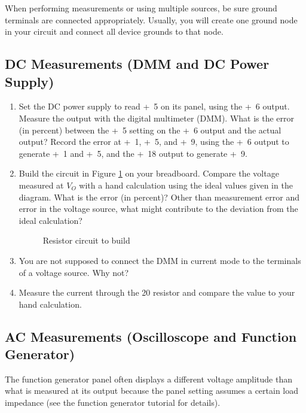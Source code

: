 \documentclass{article}
\begin{document}
When performing measurements or using multiple sources, be sure ground terminals are connected appropriately. Usually, you will create one ground node in your circuit and connect all device grounds to that node.

\subsection{DC Measurements (DMM and DC Power Supply)}

\begin{enumerate}

\item Set the DC power supply to read \unit{+5}{\volt} on its panel, using the \unit{+6}{\volt} output. Measure the output with the digital multimeter (DMM). What is the error (in percent) between the \unit{+5}{\volt} setting on the \unit{+6}{\volt} output and the actual output? Record the error at \unit{+1}{\volt}, \unit{+5}{\volt}, and \unit{+9}{\volt}, using the \unit{+6}{\volt} output to generate \unit{+1}{\volt} and \unit{+5}{\volt}, and the \unit{+18}{\volt} output to generate \unit{+9}{\volt}.

\item Build the circuit in Figure \ref{r} on your breadboard. Compare the voltage measured at $V_O$ with a hand calculation using the ideal values given in the diagram. What is the error (in percent)? Other than measurement error and error in the voltage source, what might contribute to the deviation from the ideal calculation?  

	\begin{figure}[!htb]
		
		\centerline{\box\graph}
		\caption{Resistor circuit to build}
		\label{r}
	\end{figure}

\item You are not supposed to connect the DMM in current mode to the terminals of a voltage source. Why not?

\item Measure the current through the \unit{20}{\kilo\ohm} resistor and compare the value to your hand calculation. 

\end{enumerate}

\subsection{AC Measurements (Oscilloscope and Function Generator)}
The function generator panel often displays a different voltage amplitude than what is measured at its output because the panel setting assumes a certain load impedance (see the function generator tutorial for details). 
\end{document}

